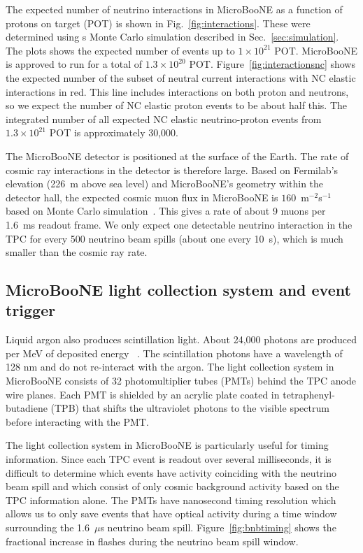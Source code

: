   The expected number of neutrino interactions in MicroBooNE as a function of
  protons on target (POT) is shown in Fig.~\ref{fig:interactions}. These were
  determined using s Monte Carlo simulation described in
  Sec.~\ref{sec:simulation}. The plots shows the expected number of events up
  to $1\times 10^{21}$ POT. MicroBooNE is approved to run for a total of
  $1.3\times 10^{20}$ POT. Figure~\ref{fig:interactionsnc} shows the expected
  number of the subset of neutral current interactions with NC elastic
  interactions in red. This line includes interactions on both proton and
  neutrons, so we expect the number of NC elastic proton events to be about
  half this. The integrated number of all expected NC elastic neutrino-proton
  events from $1.3\times 10^{21}$ POT is approximately 30,000.

  The MicroBooNE detector is positioned at the surface of the Earth. The rate
  of cosmic ray interactions in the detector is therefore large. Based on
  Fermilab's elevation (226~m above sea level) and MicroBooNE's geometry within
  the detector hall, the expected cosmic muon flux in MicroBooNE is
  $160$~m$^{-2}$s$^{-1}$ based on Monte Carlo simulation~\cite{cosmicnote}.
  This gives a rate of about 9 muons per 1.6~ms readout frame. We only expect
  one detectable neutrino interaction in the TPC for every 500 neutrino beam
  spills (about one every 10~s), which is much smaller than the cosmic ray
  rate.

\subsection{MicroBooNE light collection system and event trigger}\label{sec:swtrigger}
  Liquid argon also produces scintillation light. About 24,000 photons are
  produced per MeV of deposited energy ~\cite{detectorpaper}. The scintillation
  photons have a wavelength of 128 nm and do not re-interact with the argon.
  The light collection system in MicroBooNE consists of 32 photomultiplier
  tubes (PMTs) behind the TPC anode wire planes. Each PMT is shielded by an
  acrylic plate coated in tetraphenyl-butadiene (TPB) that shifts the
  ultraviolet photons to the visible spectrum before interacting with the PMT.

  The light collection system in MicroBooNE is particularly useful for timing
  information. Since each TPC event is readout over several milliseconds, it is
  difficult to determine which events have activity coinciding with the
  neutrino beam spill and which consist of only cosmic background activity
  based on the TPC information alone. The PMTs have nanosecond timing
  resolution which allows us to only save events that have optical activity
  during a time window surrounding the 1.6~$\mu$s neutrino beam spill.
  Figure~\ref{fig:bnbtiming} shows the fractional increase in flashes during
  the neutrino beam spill window.

